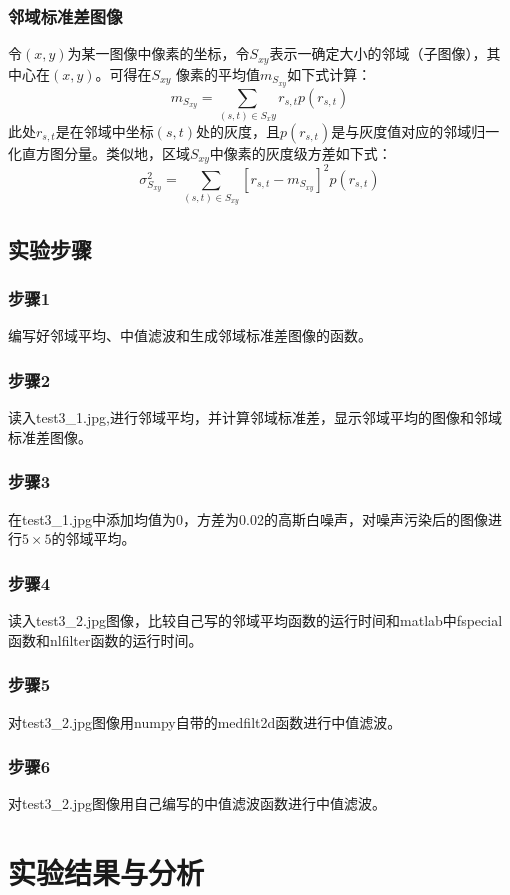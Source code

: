 \documentclass[]{IEEEphot}
\begin{document}
\subsubsection{邻域标准差图像}
令$(x,y)$为某一图像中像素的坐标，令$S_{xy}$表示一确定大小的邻域（子图像），其中心在$(x,y)$。可得在$S_{xy}$ 像素的平均值$m_{S_{xy}}$如下式计算：
\begin{equation}
	m_{S_{xy}}=\sum_{(s,t)\in{S_xy}}r_{s,t}p(r_{s,t})
\end{equation}
此处$r_{s,t}$是在邻域中坐标$(s,t)$处的灰度，且$p(r_{s,t})$是与灰度值对应的邻域归一化直方图分量。类似地，区域$S_{xy}$中像素的灰度级方差如下式：
\begin{equation}
	\sigma^2_{S_{xy}}=\sum_{(s,t)\in{S_{xy}}}[r_{s,t}-m_{S_{xy}}]^2p(r_{s,t})
\end{equation}
\subsection{实验步骤}
\subsubsection{步骤1}
编写好邻域平均、中值滤波和生成邻域标准差图像的函数。
\subsubsection{步骤2}
读入test3\_1.jpg,进行邻域平均，并计算邻域标准差，显示邻域平均的图像和邻域标准差图像。
\subsubsection{步骤3}
在test3\_1.jpg中添加均值为0，方差为0.02的高斯白噪声，对噪声污染后的图像进行$5\times5$的邻域平均。
\subsubsection{步骤4}
读入test3\_2.jpg图像，比较自己写的邻域平均函数的运行时间和matlab中fspecial函数和nlfilter函数的运行时间。
\subsubsection{步骤5}
对test3\_2.jpg图像用numpy自带的medfilt2d函数进行中值滤波。
\subsubsection{步骤6}
对test3\_2.jpg图像用自己编写的中值滤波函数进行中值滤波。
\section{实验结果与分析}
\end{document}
